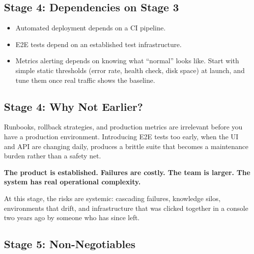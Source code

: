 \subsection*{Stage 4: Dependencies on Stage 3}\label{writing-good-code:stage-4-dependencies-on-stage-3}

\begin{itemize}
\tightlist
\item
  Automated deployment depends on a CI pipeline.
\item
  E2E tests depend on an established test infrastructure.
\item
  Metrics alerting depends on knowing what ``normal'' looks like. Start with simple static thresholds (error rate, health check, disk space) at launch, and tune them once real traffic shows the baseline.
\end{itemize}

\subsection*{Stage 4: Why Not Earlier?}\label{writing-good-code:stage-4-why-not-earlier}

Runbooks, rollback strategies, and production metrics are irrelevant before you have a production environment. Introducing E2E tests too early, when the UI and API are changing daily, produces a brittle suite that becomes a maintenance burden rather than a safety net.

\label{writing-good-code:stage-5--scale-and-reliability}

\begin{notebox}

\textbf{The product is established. Failures are costly. The team is larger. The system has real operational complexity.}

\end{notebox}

\noindent{}At this stage, the risks are systemic: cascading failures, knowledge silos, environments that drift, and infrastructure that was clicked together in a console two years ago by someone who has since left.

\subsection*{Stage 5: Non-Negotiables}\label{writing-good-code:stage-5-non-negotiables}

